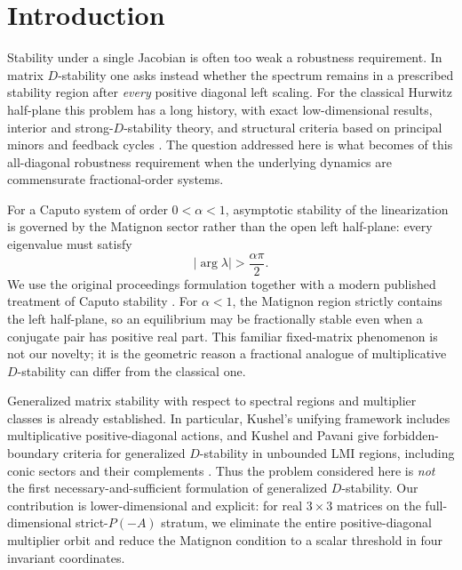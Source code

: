 \section{Introduction}\label{sec:introduction}

Stability under a single Jacobian is often too weak a robustness requirement. In matrix \(D\)-stability one asks instead whether the spectrum remains in a prescribed stability region after \emph{every} positive diagonal left scaling. For the classical Hurwitz half-plane this problem has a long history, with exact low-dimensional results, interior and strong-\(D\)-stability theory, and structural criteria based on principal minors and feedback cycles \cite{Cain1976,Hartfiel1980,Kushel2019}. The question addressed here is what becomes of this all-diagonal robustness requirement when the underlying dynamics are commensurate fractional-order systems.

For a Caputo system of order \(0<\alpha<1\), asymptotic stability of the linearization is governed by the Matignon sector rather than the open left half-plane: every eigenvalue must satisfy
\[
 |\arg \lambda|>\frac{\alpha\pi}{2}.
\]
We use the original proceedings formulation together with a modern published treatment of Caputo stability \cite{Matignon1996,BrandiburGarrappaKaslik2021}. For \(\alpha<1\), the Matignon region strictly contains the left half-plane, so an equilibrium may be fractionally stable even when a conjugate pair has positive real part. This familiar fixed-matrix phenomenon is not our novelty; it is the geometric reason a fractional analogue of multiplicative \(D\)-stability can differ from the classical one.

Generalized matrix stability with respect to spectral regions and multiplier classes is already established. In particular, Kushel's unifying framework includes multiplicative positive-diagonal actions, and Kushel and Pavani give forbidden-boundary criteria for generalized \(D\)-stability in unbounded LMI regions, including conic sectors and their complements \cite{Kushel2019,KushelPavaniJDDE}. Thus the problem considered here is \emph{not} the first necessary-and-sufficient formulation of generalized \(D\)-stability. Our contribution is lower-dimensional and explicit: for real \(3\times3\) matrices on the full-dimensional strict-\(P(-A)\) stratum, we eliminate the entire positive-diagonal multiplier orbit and reduce the Matignon condition to a scalar threshold in four invariant coordinates.

